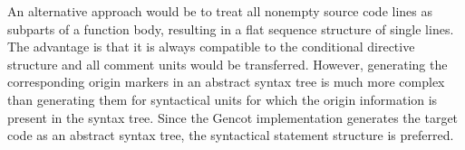 An alternative approach would be to treat all nonempty source code lines as subparts of a function body, resulting
in a flat sequence structure of single lines. The advantage is that it is always compatible to the conditional 
directive structure and
all comment units would be transferred. However, generating the corresponding origin markers in an abstract syntax
tree is much more complex than generating them for syntactical units for which the origin information is present
in the syntax tree. Since the Gencot implementation generates the
target code as an abstract syntax tree, the syntactical statement structure is preferred. 
